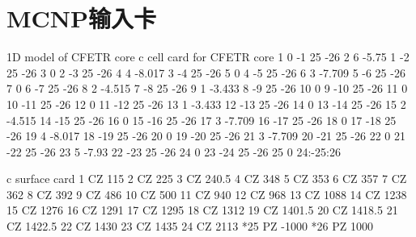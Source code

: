 \chapter{MCNP输入卡}

\begin{python}
1D model of CFETR core                                                          
c cell card for CFETR core                                                     
1 0 -1 25 -26
2 6 -5.75 1 -2 25 -26
3 0 2 -3 25 -26
4 4 -8.017 3 -4 25 -26
5 0 4 -5 25 -26
6 3 -7.709 5 -6 25 -26
7 0 6 -7 25 -26
8 2 -4.515 7 -8 25 -26
9 1 -3.433 8 -9 25 -26
10 0 9 -10 25 -26
11 0 10 -11 25 -26
12 0 11 -12 25 -26
13 1 -3.433 12 -13 25 -26
14 0 13 -14 25 -26
15 2 -4.515 14 -15 25 -26
16 0 15 -16 25 -26
17 3 -7.709 16 -17 25 -26
18 0 17 -18 25 -26
19 4 -8.017 18 -19 25 -26
20 0 19 -20 25 -26
21 3 -7.709 20 -21 25 -26
22 0 21 -22 25 -26
23 5 -7.93 22 -23 25 -26
24 0 23 -24 25 -26
25 0 24:-25:26                                          

c surface card
1 CZ 115
2 CZ 225
3 CZ 240.5
4 CZ 348                                            
5 CZ 353
6 CZ 357
7 CZ 362
8 CZ 392
9 CZ 486
10 CZ 500                                                                    
11 CZ 940                                                                     
12 CZ 968                                                                     
13 CZ 1088                                                                    
14 CZ 1238                                                                    
15 CZ 1276                                                                    
16 CZ 1291                                                                  
17 CZ 1295                                                                 
18 CZ 1312                                                                 
19 CZ 1401.5
20 CZ 1418.5
21 CZ 1422.5                                                               
22 CZ 1430
23 CZ 1435
24 CZ 2113
*25 PZ -1000
*26 PZ 1000


\end{python}
